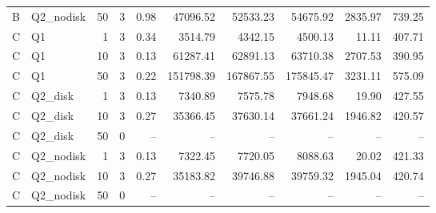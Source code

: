 \documentclass[11pt,letterpaper]{article}
\begin{document}
{\begin{longtable}{llrrrrrrrr}
B & Q2\_nodisk & 50 & 3 & 0.98 & 47096.52 & 52533.23 & 54675.92 & 2835.97 & 739.25\\
C & Q1 & 1 & 3 & 0.34 & 3514.79 & 4342.15 & 4500.13 & 11.11 & 407.71\\
C & Q1 & 10 & 3 & 0.13 & 61287.41 & 62891.13 & 63710.38 & 2707.53 & 390.95\\
C & Q1 & 50 & 3 & 0.22 & 151798.39 & 167867.55 & 175845.47 & 3231.11 & 575.09\\
C & Q2\_disk & 1 & 3 & 0.13 & 7340.89 & 7575.78 & 7948.68 & 19.90 & 427.55\\
C & Q2\_disk & 10 & 3 & 0.27 & 35366.45 & 37630.14 & 37661.24 & 1946.82 & 420.57\\
C & Q2\_disk & 50 & 0 & -- & -- & -- & -- & -- & --\\
C & Q2\_nodisk & 1 & 3 & 0.13 & 7322.45 & 7720.05 & 8088.63 & 20.02 & 421.33\\
C & Q2\_nodisk & 10 & 3 & 0.27 & 35183.82 & 39746.88 & 39759.32 & 1945.04 & 420.74\\
C & Q2\_nodisk & 50 & 0 & -- & -- & -- & -- & -- & --\\
\end{longtable}}
\clearpage
\end{document}
